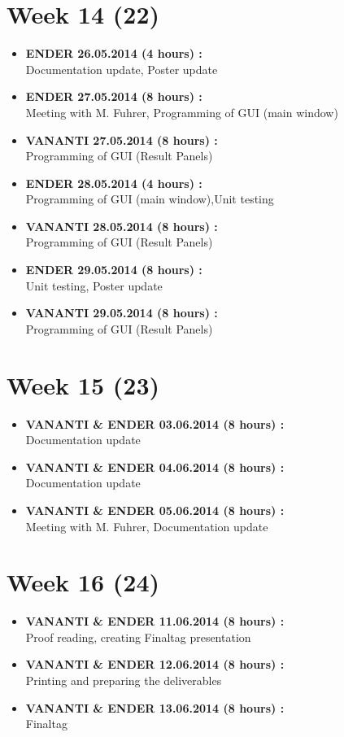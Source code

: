\documentclass[
	a4paper,					10pt,							twoside,					openright,				notitlepage,			parskip=half,			]{scrreprt}
\begin{document}
\section*{Week 14 (22)}
\label{sec:worklog_14}
\begin{itemize}
\item{\textbf{ENDER 26.05.2014 (4 hours) :} \\  Documentation update, Poster update}
\item{\textbf{ENDER 27.05.2014 (8 hours) :} \\  Meeting with M. Fuhrer, Programming of GUI (main window)}
\item{\textbf{VANANTI 27.05.2014 (8 hours) :} \\  Programming of GUI (Result Panels)}
\item{\textbf{ENDER 28.05.2014 (4 hours) :} \\  Programming of GUI (main window),Unit testing}
\item{\textbf{VANANTI 28.05.2014 (8 hours) :} \\  Programming of GUI (Result Panels)}
\item{\textbf{ENDER 29.05.2014 (8 hours) :} \\  Unit testing, Poster update}
\item{\textbf{VANANTI 29.05.2014 (8 hours) :} \\  Programming of GUI (Result Panels)}
\end{itemize}
\section*{Week 15 (23)}
\label{sec:worklog_15}
\begin{itemize}
\item{\textbf{VANANTI \& ENDER 03.06.2014 (8 hours) :} \\  Documentation update}
\item{\textbf{VANANTI \& ENDER 04.06.2014 (8 hours) :} \\  Documentation update}
\item{\textbf{VANANTI \& ENDER 05.06.2014 (8 hours) :} \\  Meeting with M. Fuhrer, Documentation update}
\end{itemize}
\section*{Week 16 (24)}
\label{sec:worklog_16}
\begin{itemize}
\item{\textbf{VANANTI \& ENDER 11.06.2014 (8 hours) :} \\  Proof reading, creating Finaltag presentation}
\item{\textbf{VANANTI \& ENDER 12.06.2014 (8 hours) :} \\  Printing and preparing the deliverables}
\item{\textbf{VANANTI \& ENDER 13.06.2014 (8 hours) :} \\  Finaltag}
\end{itemize}\clearpage{}

\end{document}
